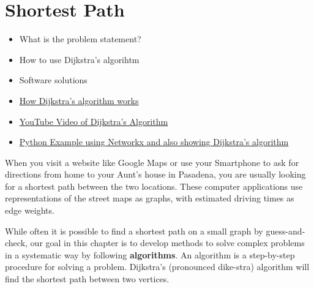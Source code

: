\section{Shortest Path}
\begin{outcome}
\begin{itemize}
\item What is the problem statement?
\item How to use Dijkstra's algorihtm
\item Software solutions
\end{itemize}
\end{outcome}
\begin{resource}
\begin{itemize}
\item \href{https://www.youtube.com/watch?v=EFg3u_E6eHU&ab_channel=SpanningTree}{How Dijkstra's algorithm works}
\item \href{https://youtu.be/EFg3u_E6eHU}{YouTube Video of Dijkstra's Algorithm}
\item \href{https://github.com/open-optimization/open-optimization-or-book/blob/master/instructive-code/networkx%20example%20-%20Dijkstra's%20Algorithm.ipynb}{Python Example using Networkx and also showing Dijkstra's algorithm}
\end{itemize}
\end{resource}
When you visit a website like Google Maps or use your Smartphone to ask for directions from home to your Aunt's house in Pasadena, you are usually looking for a shortest path between the two locations.  These computer applications use representations of the street maps as graphs, with estimated driving times as edge weights.

While often it is possible to find a shortest path on a small graph by guess-and-check, our goal in this chapter is to develop methods to solve complex problems in a systematic way by following \textbf{algorithms}.  An algorithm is a step-by-step procedure for solving a problem.  Dijkstra's (pronounced dike-stra) algorithm will find the shortest path between two vertices.

